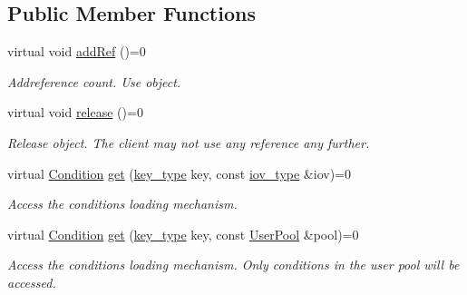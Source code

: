 \subsection*{Public Member Functions}
\begin{DoxyCompactItemize}
\item 
virtual void \hyperlink{class_d_d4hep_1_1_conditions_1_1_conditions_loader_aec8e8abc8bbb54bf20f75c8197b8e71f}{add\+Ref} ()=0
\begin{DoxyCompactList}\small\item\em Addreference count. Use object. \end{DoxyCompactList}\item 
virtual void \hyperlink{class_d_d4hep_1_1_conditions_1_1_conditions_loader_a0d1ad39d3ed19e648c673497c6995079}{release} ()=0
\begin{DoxyCompactList}\small\item\em Release object. The client may not use any reference any further. \end{DoxyCompactList}\item 
virtual \hyperlink{class_d_d4hep_1_1_conditions_1_1_condition}{Condition} \hyperlink{class_d_d4hep_1_1_conditions_1_1_conditions_loader_a9705bbf09205a5f20a979ae3fe1005bb}{get} (\hyperlink{class_d_d4hep_1_1_conditions_1_1_conditions_loader_ac77fe60ee60373d61aed19b200949c93}{key\+\_\+type} key, const \hyperlink{class_d_d4hep_1_1_conditions_1_1_conditions_loader_a5647851492a3b1469208473fe6d96329}{iov\+\_\+type} \&iov)=0
\begin{DoxyCompactList}\small\item\em Access the conditions loading mechanism. \end{DoxyCompactList}\item 
virtual \hyperlink{class_d_d4hep_1_1_conditions_1_1_condition}{Condition} \hyperlink{class_d_d4hep_1_1_conditions_1_1_conditions_loader_a9d8cacc0e3520074b386d157906a376f}{get} (\hyperlink{class_d_d4hep_1_1_conditions_1_1_conditions_loader_ac77fe60ee60373d61aed19b200949c93}{key\+\_\+type} key, const \hyperlink{class_d_d4hep_1_1_conditions_1_1_user_pool}{User\+Pool} \&pool)=0
\begin{DoxyCompactList}\small\item\em Access the conditions loading mechanism. Only conditions in the user pool will be accessed. \end{DoxyCompactList}\end{DoxyCompactItemize}
